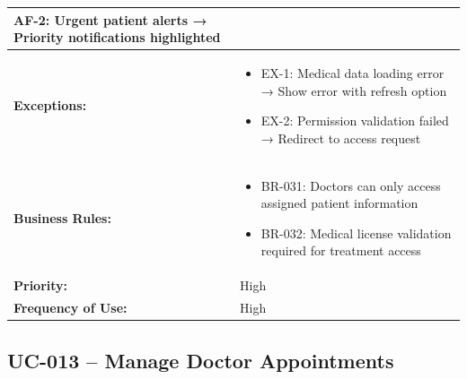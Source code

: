\documentclass[12pt,a4paper]{article}
\begin{document}
\begin{longtable}{|p{4.5cm}|p{10.5cm}|}
\textbf{AF-2:} Urgent patient alerts → Priority notifications highlighted \\
\hline
\textbf{Exceptions:} &
\begin{itemize}
  \item EX-1: Medical data loading error → Show error with refresh option
  \item EX-2: Permission validation failed → Redirect to access request
\end{itemize} \\
\hline
\textbf{Business Rules:} &
\begin{itemize}
  \item BR-031: Doctors can only access assigned patient information
  \item BR-032: Medical license validation required for treatment access
\end{itemize} \\
\hline
\textbf{Priority:} & High \\
\hline
\textbf{Frequency of Use:} & High \\
\hline
\end{longtable}

\subsection{UC-013 – Manage Doctor Appointments}
\end{document}
